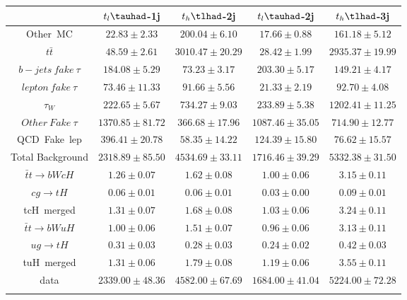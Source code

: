 \centering
\begin{tabular}{ccccc} \toprule\toprule
 & $t_{l}\tauhad$-1j & $t_{h}\tlhad$-2j & $t_{l}\tauhad$-2j & $t_{h}\tlhad$-3j\\\midrule
Other~MC & $22.83\pm2.33$ & $200.04\pm6.10$ & $17.66\pm0.88$ & $161.18\pm5.12$\\
$t\bar{t}$ & $48.59\pm2.61$ & $3010.47\pm20.29$ & $28.42\pm1.99$ & $2935.37\pm19.99$\\
$b-jets~fake~\tau$ & $184.08\pm5.29$ & $73.23\pm3.17$ & $203.30\pm5.17$ & $149.21\pm4.17$\\
$lepton~fake~\tau$ & $73.46\pm11.33$ & $91.66\pm5.56$ & $21.33\pm2.19$ & $92.70\pm4.08$\\
$\tau_{W}$ & $222.65\pm5.67$ & $734.27\pm9.03$ & $233.89\pm5.38$ & $1202.41\pm11.25$\\
$Other~Fake~\tau$ & $1370.85\pm81.72$ & $366.68\pm17.96$ & $1087.46\pm35.05$ & $714.90\pm12.77$\\
QCD~Fake~lep & $396.41\pm20.78$ & $58.35\pm14.22$ & $124.39\pm15.80$ & $76.62\pm15.57$\\\midrule
Total Background & $2318.89\pm85.50$ & $4534.69\pm33.11$ & $1716.46\pm39.29$ & $5332.38\pm31.50$\\\midrule\midrule
$\bar{t}t\to bWcH$ & $1.26\pm0.07$ & $1.62\pm0.08$ & $1.00\pm0.06$ & $3.15\pm0.11$\\
$cg\to tH$ & $0.06\pm0.01$ & $0.06\pm0.01$ & $0.03\pm0.00$ & $0.09\pm0.01$\\
tcH~merged & $1.31\pm0.07$ & $1.68\pm0.08$ & $1.03\pm0.06$ & $3.24\pm0.11$\\\midrule
$\bar{t}t\to bWuH$ & $1.00\pm0.06$ & $1.51\pm0.07$ & $0.96\pm0.06$ & $3.13\pm0.11$\\
$ug\to tH$ & $0.31\pm0.03$ & $0.28\pm0.03$ & $0.24\pm0.02$ & $0.42\pm0.03$\\
tuH~merged & $1.31\pm0.06$ & $1.79\pm0.08$ & $1.19\pm0.06$ & $3.55\pm0.11$\\\midrule\midrule
data & $2339.00\pm48.36$ & $4582.00\pm67.69$ & $1684.00\pm41.04$ & $5224.00\pm72.28$\\
\bottomrule\bottomrule\\
\end{tabular}
